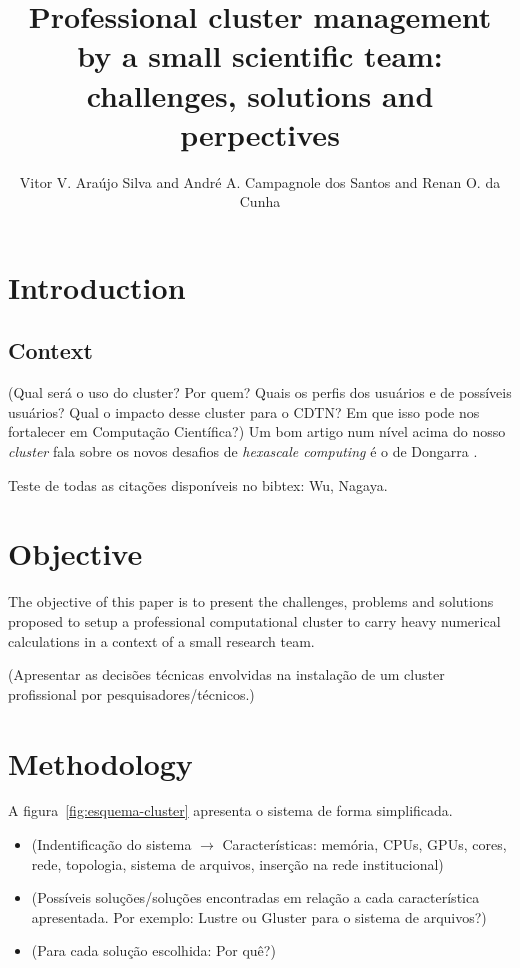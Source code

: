 \documentclass{anstrans}
\title{Professional cluster management by a small scientific team: challenges, solutions
and perpectives}
\author{Vitor V. Araújo Silva and André A. Campagnole dos Santos and Renan O. da Cunha}
\institute{
  Centro de Desenvolvimento da Tecnologia Nuclear - CDTN
}
\begin{document}
\vspace*{-42pt}
\begin{strip}
\vspace*{14pt}
\end{strip}


\section{Introduction}


\subsection{Context}
(Qual será o uso do cluster? Por quem? Quais os perfis dos usuários e de possíveis usuários?
Qual o impacto desse cluster para o CDTN? Em que isso pode nos fortalecer em Computação Científica?)
Um bom artigo num nível acima do nosso \textit{cluster} fala sobre os novos desafios de \textit{hexascale computing}
é o de Dongarra \cite{Dongarra2017}.

Teste de todas as citações disponíveis no bibtex: Wu\cite{Wu2016}, Nagaya\cite{Nagaya2015}.

\section{Objective}

The objective of this paper is to present the challenges, problems and solutions proposed
to setup a professional computational
cluster to carry heavy numerical calculations in a context of a small research team.

(Apresentar as decisões técnicas envolvidas na instalação de um cluster
profissional por pesquisadores/técnicos.)

\section{Methodology}

  A figura~\ref{fig:esquema-cluster} apresenta o sistema de forma simplificada.
  
\begin{itemize}

\item (Indentificação do sistema $\rightarrow$ Características: memória, CPUs, GPUs, cores, rede, topologia, sistema de arquivos, inserção na rede institucional)

\item (Possíveis soluções/soluções encontradas em relação a cada característica apresentada. Por exemplo: Lustre \cite{Lustre} ou Gluster\cite{Gluster} para o sistema de arquivos?)

\item (Para cada solução escolhida: Por quê?)
  
\end{itemize}
\end{document}
